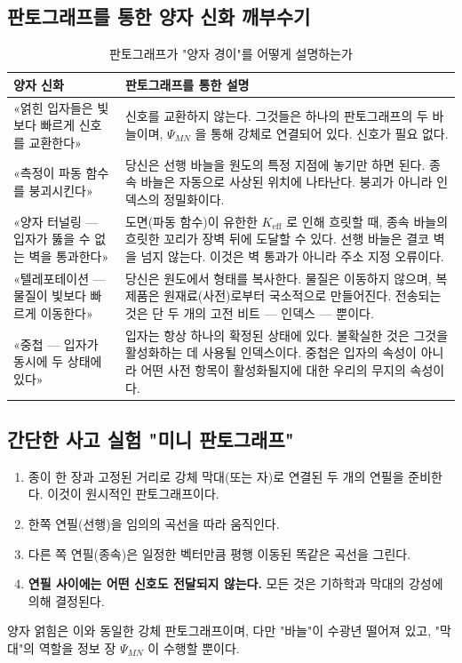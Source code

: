 \documentclass[12pt,a4paper]{article}
\begin{document}
	\subsection{판토그래프를 통한 양자 신화 깨부수기}
	
	\begin{table}[htbp]
		\centering
		\caption{판토그래프가 "양자 경이"를 어떻게 설명하는가}
		\label{tab:myths}
		\begin{tabular}{|p{4.5cm}|p{9cm}|}
			\hline
			\textbf{양자 신화} & \textbf{판토그래프를 통한 설명} \\
			\hline
			«얽힌 입자들은 빛보다 빠르게 신호를 교환한다» & 신호를 교환하지 않는다. 그것들은 하나의 판토그래프의 두 바늘이며, \(\Psi_{MN}\) 을 통해 강체로 연결되어 있다. 신호가 필요 없다. \\
			\hline
			«측정이 파동 함수를 붕괴시킨다» & 당신은 선행 바늘을 원도의 특정 지점에 놓기만 하면 된다. 종속 바늘은 자동으로 사상된 위치에 나타난다. 붕괴가 아니라 인덱스의 정밀화이다. \\
			\hline
			«양자 터널링 — 입자가 뚫을 수 없는 벽을 통과한다» & 도면(파동 함수)이 유한한 \(K_{\mathrm{eff}}\) 로 인해 흐릿할 때, 종속 바늘의 흐릿한 꼬리가 장벽 뒤에 도달할 수 있다. 선행 바늘은 결코 벽을 넘지 않는다. 이것은 벽 통과가 아니라 주소 지정 오류이다. \\
			\hline
			«텔레포테이션 — 물질이 빛보다 빠르게 이동한다» & 당신은 원도에서 형태를 복사한다. 물질은 이동하지 않으며, 복제품은 원재료(사전)로부터 국소적으로 만들어진다. 전송되는 것은 단 두 개의 고전 비트 — 인덱스 — 뿐이다. \\
			\hline
			«중첩 — 입자가 동시에 두 상태에 있다» & 입자는 항상 하나의 확정된 상태에 있다. 불확실한 것은 그것을 활성화하는 데 사용될 인덱스이다. 중첩은 입자의 속성이 아니라 어떤 사전 항목이 활성화될지에 대한 우리의 무지의 속성이다. \\
			\hline
		\end{tabular}
	\end{table}
	
	\subsection{간단한 사고 실험 "미니 판토그래프"}
	
	\begin{enumerate}
		\item 종이 한 장과 고정된 거리로 강체 막대(또는 자)로 연결된 두 개의 연필을 준비한다. 이것이 원시적인 판토그래프이다.
		\item 한쪽 연필(선행)을 임의의 곡선을 따라 움직인다.
		\item 다른 쪽 연필(종속)은 일정한 벡터만큼 평행 이동된 똑같은 곡선을 그린다.
		\item \textbf{연필 사이에는 어떤 신호도 전달되지 않는다.} 모든 것은 기하학과 막대의 강성에 의해 결정된다.
	\end{enumerate}
	양자 얽힘은 이와 동일한 강체 판토그래프이며, 다만 "바늘"이 수광년 떨어져 있고, "막대"의 역할을 정보 장 \(\Psi_{MN}\) 이 수행할 뿐이다.
	
\end{document}
